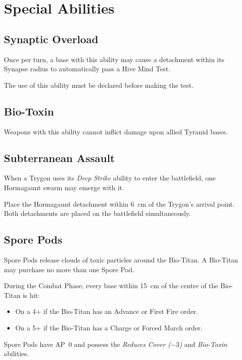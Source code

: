 \section{Special Abilities}

\subsection{Synaptic Overload}

Once per turn, a base with this ability may cause a detachment within its Synapse radius to automatically pass a Hive Mind Test.

The use of this ability must be declared before making the test.

\subsection{Bio-Toxin}

Weapons with this ability cannot inflict damage upon allied Tyranid bases.

\subsection{Subterranean Assault}

When a Trygon uses its \textit{Deep Strike} ability to enter the battlefield, one Hormagaunt swarm may emerge with it.

Place the Hormagaunt detachment within 6~cm of the Trygon's arrival point. Both detachments are placed on the battlefield simultaneously.

\subsection{Spore Pods}

Spore Pods release clouds of toxic particles around the Bio-Titan. A Bio-Titan may purchase no more than one Spore Pod.

During the Combat Phase, every base within 15~cm of the centre of the Bio-Titan is hit:

\begin{itemize}
    \item On a 4+ if the Bio-Titan has an Advance or First Fire order.
    \item On a 5+ if the Bio-Titan has a Charge or Forced March order.
\end{itemize}

Spore Pods have AP~0 and possess the \textit{Reduces Cover ($-3$)} and \textit{Bio-Toxin} abilities.

